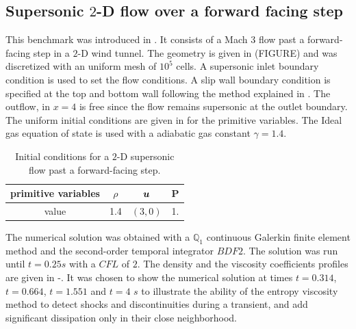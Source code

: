 \subsection{Supersonic $2$-D flow over a forward facing step} \label{sec:2d-forward-facing-step}
This benchmark was introduced in \cite{FFS}. It consists of a Mach 3 flow past a forward-facing step in a $2$-D wind tunnel. The geometry is given in (FIGURE) and was discretized with an uniform mesh of $10^5$ cells. A supersonic inlet boundary condition is used to set the flow conditions. A slip wall boundary condition is specified at the top and bottom wall following the method explained in . The outflow, in $x=4$ is free since the flow remains supersonic at the outlet boundary. The uniform initial conditions are given in  for the primitive variables. The Ideal gas equation of state is used with a adiabatic gas constant $\gamma = 1.4$.
\begin{table}[H] 
\caption{\label{tb:ic-forward-facing} Initial conditions for a $2$-D supersonic flow past a forward-facing step.}
\begin{center}
\begin{tabular}{|c|c|c|c|}
\hline
 primitive variables   & $\rho$ & $\boldsymbol u$ & P \\ \hline
value & 1.4 & $(3,0)$ & 1.\\ \hline
\end{tabular}
\end{center}
\nonumber
\end{table}
The numerical solution was obtained with a $\mathbb Q_1$ continuous Galerkin finite element method and the second-order temporal integrator $BDF2$. The solution was run until $t=0.25s$ with a $CFL$ of $2$. The density and the viscosity coefficients profiles are given in -. It was chosen to show the numerical solution at times $t=0.314$, $t=0.664$, $t=1.551$ and $t=4$ $s$ to illustrate the ability of the entropy viscosity method to detect shocks and discontinuities during a transient, and add significant dissipation only in their close neighborhood. 
